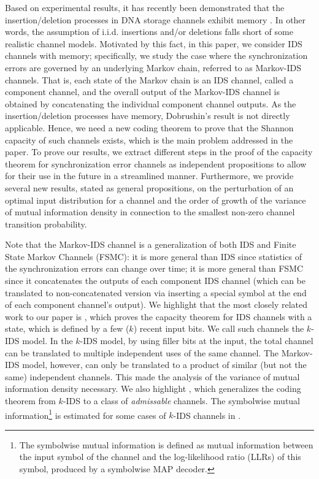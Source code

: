 \documentclass[journal, twocol]{IEEEtran}
\begin{document}
Based on experimental results, it has recently been demonstrated that the insertion/deletion processes in DNA storage channels exhibit memory \cite{hamoum23channel,deng19optimized}. 
In other words, the assumption of i.i.d. insertions and/or deletions falls short of some realistic channel models. 
Motivated by this fact, in this paper, we consider IDS channels with memory; specifically, we study the case where the synchronization errors are governed by an underlying Markov chain, referred to as Markov-IDS channels. 
That is, each state of the Markov chain is an IDS channel, called a component channel, and the overall output of the Markov-IDS channel is obtained by concatenating the individual component channel outputs. 
As the insertion/deletion processes have memory, Dobrushin's result is not directly applicable. 
Hence, we need a new coding theorem to prove that the Shannon capacity of such channels exists, which is the main problem addressed in the paper. 
To prove our results, we extract different steps in the proof of the capacity theorem for synchronization error channels as independent propositions to allow for their use in the future in a streamlined manner. 
Furthermore, we provide several new results, stated as general propositions, on the perturbation of an optimal input distribution for a channel and the order of growth of the variance of mutual information density in connection to the smallest non-zero channel transition probability.

Note that the Markov-IDS channel is a generalization of both IDS and Finite State Markov Channels (FSMC): it is more general than IDS since statistics of the synchronization errors can change over time; it is more general than FSMC since it concatenates the outputs of each component IDS channel (which can be translated to non-concatenated version via inserting a special symbol at the end of each component channel's output). 
We highlight that the most closely related work to our paper is \cite{mao18models}, which proves the capacity theorem for IDS channels with a state, which is defined by a few ($k$) recent input bits.
We call such channels the $k$-IDS model.
In the $k$-IDS model, by using filler bits at the input, the total channel can be translated to multiple independent uses of the same channel.
The Markov-IDS model, however, can only be translated to a product of similar (but not the same) independent channels.
This made the analysis of the variance of mutual information density necessary.
We also highlight \cite{con2025channels}, which generalizes the coding theorem from $k$-IDS to a class of \emph{admissable} channels.
The symbolwise mutual information\footnote{The symbolwise mutual information is defined as mutual information between the input symbol of the channel and the log-likelihood ratio (LLRs) of this symbol, produced by a symbolwise MAP decoder.} is estimated for some cases of $k$-IDS channels in \cite{maarouf23achievable}. 
\end{document}
